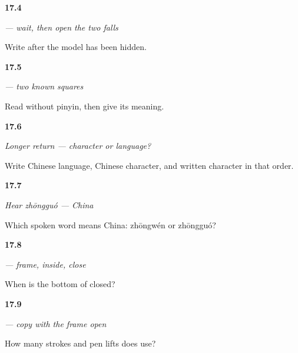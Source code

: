 \noindent\begin{minipage}[t]{\linewidth}
\raggedright
\hypertarget{review-ZH-W17-wen-delayed-write}{\textbf{17.4}} \emph{ — wait, then open the two falls}\par
\small Write  after the model has been hidden.
\end{minipage}\par\medskip

\noindent\begin{minipage}[t]{\linewidth}
\raggedright
\hypertarget{review-ZH-C17-zhongwen-read}{\textbf{17.5}} \emph{ — two known squares}\par
\small Read  without pinyin, then give its meaning.
\end{minipage}\par\medskip

\noindent\begin{minipage}[t]{\linewidth}
\raggedright
\hypertarget{review-ZH-R17-character-language-r2-write}{\textbf{17.6}} \emph{Longer return — character or language?}\par
\small Write Chinese language, Chinese character, and written character in that order.
\end{minipage}\par\medskip

\noindent\begin{minipage}[t]{\linewidth}
\raggedright
\hypertarget{review-ZH-C17-hear-zhongguo-meaning}{\textbf{17.7}} \emph{Hear \emph{zhōngguó} — China}\par
\small Which spoken word means China: zhōngwén or zhōngguó?
\end{minipage}\par\medskip

\noindent\begin{minipage}[t]{\linewidth}
\raggedright
\hypertarget{review-ZH-W17-guo-observe-close}{\textbf{17.8}} \emph{ — frame, inside, close}\par
\small When is the bottom of  closed?
\end{minipage}\par\medskip

\noindent\begin{minipage}[t]{\linewidth}
\raggedright
\hypertarget{review-ZH-W17-guo-guided-count}{\textbf{17.9}} \emph{ — copy with the frame open}\par
\small How many strokes and pen lifts does  use?
\end{minipage}\par\medskip

